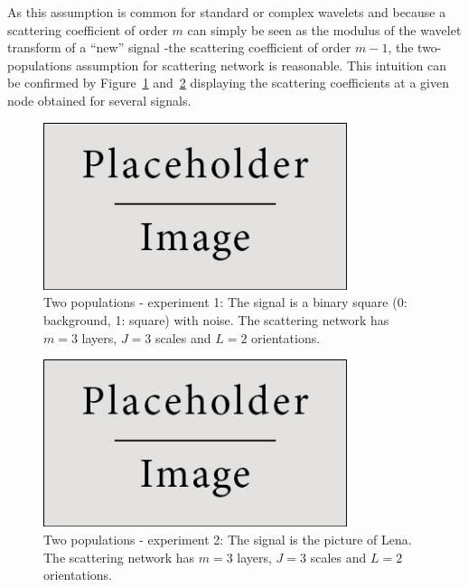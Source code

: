 \documentclass[a4paper,11pt]{report}
\begin{document}
    As this assumption is common for standard or complex wavelets \cite{kingsbury2001complex} and because a scattering coefficient of order $m$ can simply be seen as the modulus of the wavelet transform of a ``new'' signal -\ie the scattering coefficient of order $m-1$, the two-populations assumption for scattering network is reasonable. This intuition can be confirmed by Figure~\ref{fig:2pop - 1} and~\ref{fig:2pop - 2} displaying the scattering coefficients at a given node obtained for several signals.\\
    
		\begin{figure}
				\begin{center}
					\includegraphics[width=3.5in]{placeholder.jpg}
					\caption[Two populations - experiment 1.]{Two populations - experiment 1: The signal is a binary square (0: background, 1: square) with noise. The scattering network has $m=3$ layers, $J=3$ scales and $L=2$ orientations.} %
					\label{fig:2pop - 1}
				\end{center}
		\end{figure}    
		
		\begin{figure}
				\begin{center}
					\includegraphics[width=3.5in]{placeholder.jpg}
					\caption[Two populations - experiment 2.]{Two populations - experiment 2: The signal is the picture of Lena. The scattering network has $m=3$ layers, $J=3$ scales and $L=2$ orientations.} %
					\label{fig:2pop - 2}
				\end{center}
		\end{figure}
		
\end{document}

